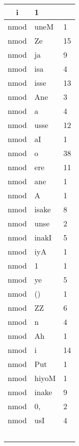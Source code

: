 \documentclass[a4 paper]{article}
\begin{document}
\begin{longtable}{cp{}p{}}
i & 1\\ \midrule nmod & uneM & 1\\ \midrule nmod & Ze & 15\\ \midrule nmod & ja & 9\\ \midrule nmod & isa & 4\\ \midrule nmod & isse & 13\\ \midrule nmod & Ane & 3\\ \midrule nmod & a & 4\\ \midrule nmod & usse & 12\\ \midrule nmod & aI & 1\\ \midrule nmod & o & 38\\ \midrule nmod & ere & 11\\ \midrule nmod & ane & 1\\ \midrule nmod & A & 1\\ \midrule nmod & isake & 8\\ \midrule nmod & unse & 2\\ \midrule nmod & inakI & 5\\ \midrule nmod & iyA & 1\\ \midrule nmod & 1 & 1\\ \midrule nmod & ye & 5\\ \midrule nmod & () & 1\\ \midrule nmod & ZZ & 6\\ \midrule nmod & n & 4\\ \midrule nmod & Ah & 1\\ \midrule nmod & i & 14\\ \midrule nmod & Put & 1\\ \midrule nmod & hiyoM & 1\\ \midrule nmod & inake & 9\\ \midrule nmod & 0, & 2\\ \midrule nmod & usI & 4\\ \
\end{longtable}
\end{document}
